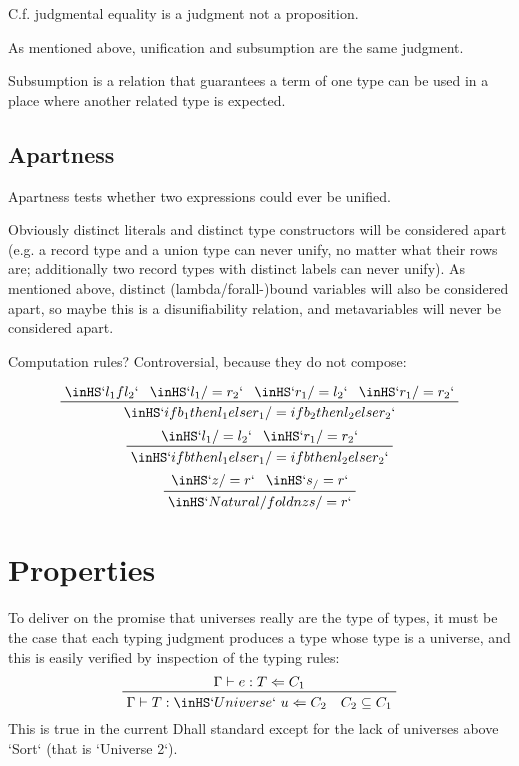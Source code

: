 \documentclass[11pt, twoside, reqno]{book}
\begin{document}
C.f. judgmental equality is a judgment not a proposition.

As mentioned above, unification and subsumption are the same judgment.

Subsumption is a relation that guarantees a term of one type can be used in a place where another related type is expected.

\section{Apartness}
Apartness tests whether two expressions could ever be unified.

Obviously distinct literals and distinct type constructors will be considered apart (e.g. a record type and a union type can never unify, no matter what their rows are; additionally two record types with distinct labels can never unify).
As mentioned above, distinct (lambda/forall-)bound variables will also be considered apart, so maybe this is a disunifiability relation, and metavariables will never be considered apart.

Computation rules?
Controversial, because they do not compose:

\begin{displaymath}
\prftree{\inHS`l_1 f l_2`}{\inHS`l_1 /= r_2`}{\inHS`r_1 /= l_2`}{\inHS`r_1 /= r_2`}{\inHS`if b_1 then l_1 else r_1 /= if b_2 then l_2 else r_2`}
\end{displaymath}
\begin{displaymath}
\prftree{\inHS`l_1 /= l_2`}{\inHS`r_1 /= r_2`}{\inHS`if b then l_1 else r_1 /= if b then l_2 else r_2`}
\end{displaymath}
\begin{displaymath}
\prftree{\inHS`z /= r`}{\inHS`s _ /= r`}{\inHS`Natural/fold n z s /= r`}
\end{displaymath}
\fi


\chapter{Properties}


To deliver on the promise that universes really are the type of types, it must be the case that each typing judgment produces a type whose type is a universe, and this is easily verified by inspection of the typing rules:
\begin{displaymath}
\prftree{\Gamma \vdash e : T \Leftarrow C_1}{\Gamma \vdash T : \inHS`Universe`\ u \Leftarrow C_2 \quad C_2 \subseteq C_1}
\end{displaymath}
This is true in the current Dhall standard except for the lack of universes above \inHS`Sort` (that is \inHS`Universe 2`).
\end{document}
